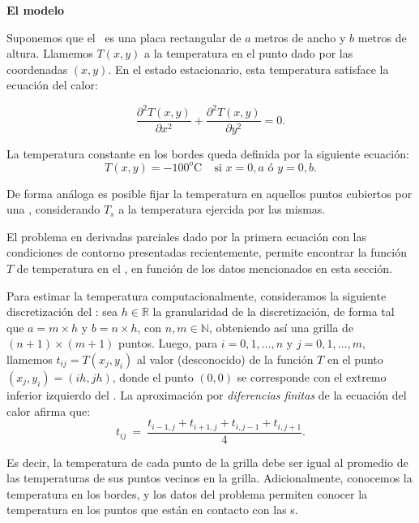 {\noindent \bf El modelo}

Suponemos que el \objeto\ es una placa rectangular de $a$ metros de ancho y $b$ metros de altura. Llamemos $T(x,y)$ a la temperatura en el punto dado por las coordenadas $(x,y)$. En el estado estacionario, esta temperatura satisface la ecuaci\'on del calor:

\begin{equation}\label{eq:calor}
\frac{\partial^2T(x,y)}{\partial x^{2}}+\frac{\partial^2 T(x,y)}{\partial y^{2}} = 0.
\end{equation}

\noindent La temperatura constante en los bordes queda definida por la siguiente ecuaci\'on:
\begin{equation}
T(x,y) = -100^o\textrm{C}~~~~~\textrm{si } x = 0,a \textrm{ \'o } y = 0,b.
\label{eq:borde}
\end{equation}

\noindent De forma an\'aloga es posible fijar la temperatura en aquellos puntos cubiertos por una \atacante, considerando $T_s$ a la temperatura ejercida por las mismas.

El problema en derivadas parciales dado por la primera ecuaci\'on con las condiciones de contorno presentadas recientemente, permite encontrar la funci\'on $T$ de temperatura en el \objeto, en funci\'on de los datos mencionados en esta secci\'on.

Para estimar la temperatura computacionalmente, con\-si\-de\-ra\-mos la siguiente discretizaci\'on del \objeto: sea $h \in \mathbb{R}$ la granularidad de la discretizaci\'on, de forma tal que $a = m\times h$ y $b = n \times h$, con $n,m \in \mathbb{N}$, obteniendo as\'i una grilla de $(n+1)\times(m+1)$ puntos. Luego, para $i=0,1,\dots,n$ y $j=0,1,\dots,m$, llamemos $t_{ij} = T(x_j,y_i)$ al valor (desconocido) de la funci\'on $T$ en el punto $(x_j, y_i) = (ih, jh)$, donde el punto $(0,0)$ se corresponde con el extremo inferior izquierdo del \objeto.
La aproximaci\'on por \emph{diferencias finitas} de la ecuaci\'on del calor afirma que:
\begin{equation}
t_{ij} \ =\ \frac{ t_{i-1,j} + t_{i+1,j} + t_{i,j-1} + t_{i,j+1}}{4}.\label{eq:calordd}
\end{equation}

Es decir, la temperatura de cada punto de la grilla debe ser igual al promedio de las tem\-pe\-ra\-tu\-ras de sus puntos vecinos en la grilla. Adicionalmente, conocemos la temperatura en los bordes, y los datos del problema permiten conocer la temperatura en los puntos que est\'an en contacto con las \atacante s.

